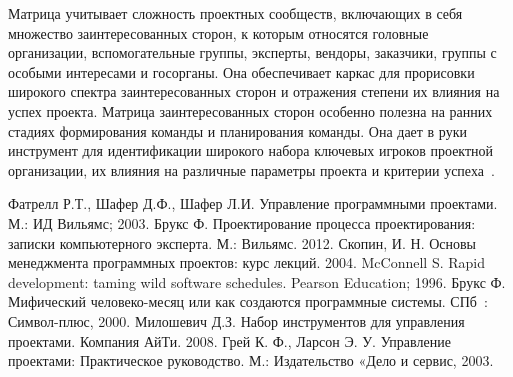 \documentclass{../industrial-development}
\begin{document}
Матрица учитывает сложность проектных сообществ, включающих в себя множество заинтересованных сторон, к которым относятся головные организации, вспомогательные группы, эксперты, вендоры, заказчики, группы с особыми интересами и госорганы. Она обеспечивает каркас для прорисовки
широкого спектра заинтересованных сторон и отражения степени их влияния на успех проекта. Матрица заинтересованных сторон особенно полезна на ранних стадиях формирования команды и планирования команды. Она дает в руки инструмент для идентификации широкого набора ключевых игроков проектной организации, их влияния на различные параметры проекта и критерии успеха~\cite[с.~405--425]{Miloshevich}.

\begin{thebibliography}{99}
 Фатрелл Р.Т., Шафер Д.Ф., Шафер Л.И. Управление программными проектами. М.: ИД Вильямс; 2003.
 Брукс Ф. Проектирование процесса проектирования: записки компьютерного эксперта. М.: Вильямс. 2012.
 Скопин, И. Н. Основы менеджмента программных проектов: курс лекций. 2004.
 McConnell S. Rapid development: taming wild software schedules. Pearson Education; 1996.
 Брукс Ф. Мифический человеко-месяц или как создаются программные системы. СПб~: Символ-плюс, 2000.
 Милошевич Д.З. Набор инструментов для управления проектами. Компания АйТи. 2008.
 Грей К. Ф., Ларсон Э. У. Управление проектами: Практическое руководство. М.: Издательство «Дело и сервис, 2003.
\end{thebibliography}
\end{document}
